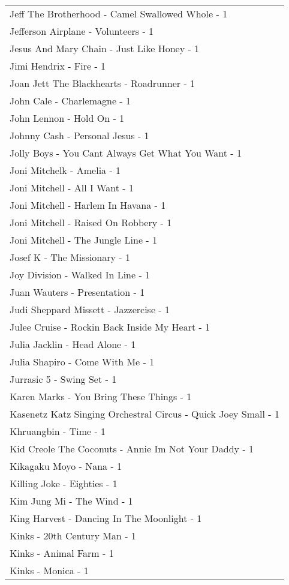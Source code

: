 \documentclass[
]{article}
\begin{document}
\begin{longtable}{l}
Jeff The Brotherhood - Camel Swallowed Whole - 1 \\ 
Jefferson Airplane - Volunteers - 1 \\ 
Jesus And Mary Chain - Just Like Honey - 1 \\ 
Jimi Hendrix - Fire - 1 \\ 
Joan Jett The Blackhearts - Roadrunner - 1 \\ 
John Cale - Charlemagne - 1 \\ 
John Lennon - Hold On - 1 \\ 
Johnny Cash - Personal Jesus - 1 \\ 
Jolly Boys - You Cant Always Get What You Want - 1 \\ 
Joni Mitchelk - Amelia - 1 \\ 
Joni Mitchell - All I Want - 1 \\ 
Joni Mitchell - Harlem In Havana - 1 \\ 
Joni Mitchell - Raised On Robbery - 1 \\ 
Joni Mitchell - The Jungle Line - 1 \\ 
Josef K - The Missionary - 1 \\ 
Joy Division - Walked In Line - 1 \\ 
Juan Wauters - Presentation - 1 \\ 
Judi Sheppard Missett - Jazzercise - 1 \\ 
Julee Cruise - Rockin Back Inside My Heart - 1 \\ 
Julia Jacklin - Head Alone - 1 \\ 
Julia Shapiro - Come With Me - 1 \\ 
Jurrasic 5 - Swing Set - 1 \\ 
Karen Marks - You Bring These Things - 1 \\ 
Kasenetz Katz Singing Orchestral Circus - Quick Joey Small - 1 \\ 
Khruangbin - Time - 1 \\ 
Kid Creole The Coconuts - Annie Im Not Your Daddy - 1 \\ 
Kikagaku Moyo - Nana - 1 \\ 
Killing Joke - Eighties - 1 \\ 
Kim Jung Mi - The Wind - 1 \\ 
King Harvest - Dancing In The Moonlight - 1 \\ 
Kinks - 20th Century Man - 1 \\ 
Kinks - Animal Farm - 1 \\ 
Kinks - Monica - 1 \\ 

\end{longtable}
\end{document}
